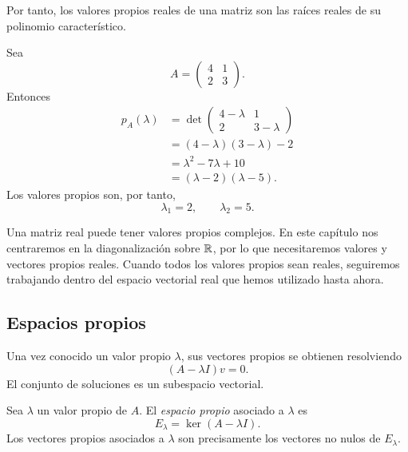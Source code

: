 Por tanto, los valores propios reales de una matriz son las raíces reales de su polinomio característico.

\begin{example}
Sea
\[
A=\begin{pmatrix}
4&1\\
2&3
\end{pmatrix}.
\]
Entonces
\[
\begin{aligned}
p_A(\lambda)
&=\det\begin{pmatrix}4-\lambda&1\\2&3-\lambda\end{pmatrix}\\
&=(4-\lambda)(3-\lambda)-2\\
&=\lambda^2-7\lambda+10\\
&=(\lambda-2)(\lambda-5).
\end{aligned}
\]
Los valores propios son, por tanto,
\[
\boxed{\lambda_1=2,\qquad \lambda_2=5.}
\]
\end{example}

Una matriz real puede tener valores propios complejos. En este capítulo nos centraremos en la diagonalización sobre $\mathbb{R}$, por lo que necesitaremos valores y vectores propios reales. Cuando todos los valores propios sean reales, seguiremos trabajando dentro del espacio vectorial real que hemos utilizado hasta ahora.

\subsection{Espacios propios}

Una vez conocido un valor propio $\lambda$, sus vectores propios se obtienen resolviendo
\[
(A-\lambda I)v=0.
\]
El conjunto de soluciones es un subespacio vectorial.

\begin{definition}
Sea $\lambda$ un valor propio de $A$. El \emph{espacio propio} asociado a $\lambda$ es
\[
E_{\lambda}=\ker(A-\lambda I).
\]
Los vectores propios asociados a $\lambda$ son precisamente los vectores no nulos de $E_\lambda$.
\end{definition}

